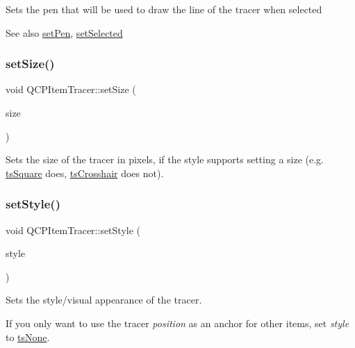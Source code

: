 Sets the pen that will be used to draw the line of the tracer when selected

\begin{DoxySeeAlso}{See also}
\hyperlink{class_q_c_p_item_tracer_af8048636fc1ef0152e51809b008df2ca}{set\+Pen}, \hyperlink{class_q_c_p_abstract_item_a203de94ad586cc44d16c9565f49d3378}{set\+Selected} 
\end{DoxySeeAlso}
\mbox{\label{class_q_c_p_item_tracer_ae47fe0617f5fef5fdb766999569be10a}} 
\subsubsection{\texorpdfstring{set\+Size()}{setSize()}}
{\footnotesize\ttfamily void Q\+C\+P\+Item\+Tracer\+::set\+Size (\begin{DoxyParamCaption}\item[{double}]{size }\end{DoxyParamCaption})}

Sets the size of the tracer in pixels, if the style supports setting a size (e.\+g. \hyperlink{class_q_c_p_item_tracer_a2f05ddb13978036f902ca3ab47076500a4ed5f01f2c5fd86d980366d79f481b9b}{ts\+Square} does, \hyperlink{class_q_c_p_item_tracer_a2f05ddb13978036f902ca3ab47076500af562ec81ac3ba99e26ef8540cf1ec16f}{ts\+Crosshair} does not). \mbox{\label{class_q_c_p_item_tracer_a41a2ac4f1acd7897b4e2a2579c03204e}} 
\subsubsection{\texorpdfstring{set\+Style()}{setStyle()}}
{\footnotesize\ttfamily void Q\+C\+P\+Item\+Tracer\+::set\+Style (\begin{DoxyParamCaption}\item[{\hyperlink{class_q_c_p_item_tracer_a2f05ddb13978036f902ca3ab47076500}{Q\+C\+P\+Item\+Tracer\+::\+Tracer\+Style}}]{style }\end{DoxyParamCaption})}

Sets the style/visual appearance of the tracer.

If you only want to use the tracer {\itshape position} as an anchor for other items, set {\itshape style} to \hyperlink{class_q_c_p_item_tracer_a2f05ddb13978036f902ca3ab47076500aac27462c79146225bfa8fba24d2ee8a4}{ts\+None}. \mbox{\label{class_q_c_p_item_tracer_a4e42d7b49f293273a74a49a2457856e2}} 
